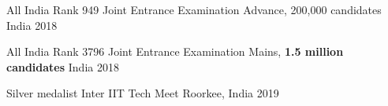 



\begin{cvhonors}

  \cvhonor
    {All India Rank 949} %
    {Joint Entrance Examination Advance, 200,000 candidates} %
    {India} %
    {2018} %

  \cvhonor
    {All India Rank 3796} %
    {Joint Entrance Examination Mains, \textbf{1.5 million candidates}} %
    {India} %
    {2018} %

  \cvhonor
    {Silver medalist} %
    {Inter IIT Tech Meet} %
    {Roorkee, India} %
    {2019} %

\end{cvhonors}
